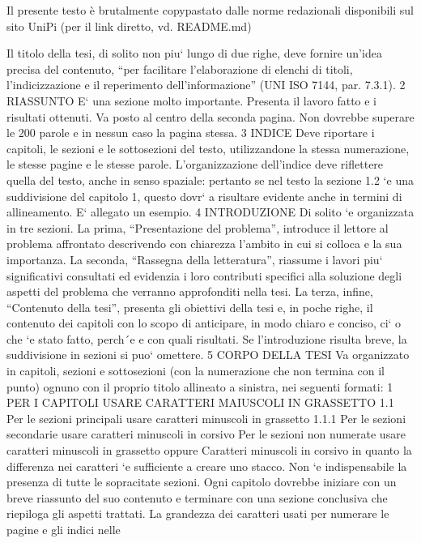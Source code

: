 Il presente testo è brutalmente copypastato dalle norme redazionali disponibili sul sito UniPi (per il link diretto, vd. README.md)

Il titolo della tesi, di solito non piu` lungo di due righe,
deve fornire un’idea precisa del contenuto, “per facilitare l’elaborazione di
elenchi di titoli, l’indicizzazione e il reperimento dell’informazione” (UNI
ISO 7144, par. 7.3.1).
2 RIASSUNTO
E` una sezione molto importante. Presenta il lavoro fatto e i risultati ottenuti.
Va posto al centro della seconda pagina. Non dovrebbe superare le 200 parole
e in nessun caso la pagina stessa.
3 INDICE
Deve riportare i capitoli, le sezioni e le sottosezioni del testo, utilizzandone
la stessa numerazione, le stesse pagine e le stesse parole. L’organizzazione
dell’indice deve riflettere quella del testo, anche in senso spaziale: pertanto
se nel testo la sezione 1.2 `e una suddivisione del capitolo 1, questo dovr` a
risultare evidente anche in termini di allineamento. E` allegato un esempio.
4 INTRODUZIONE
Di solito `e organizzata in tre sezioni. La prima, “Presentazione del problema”, introduce il lettore al problema affrontato descrivendo con chiarezza
l’ambito in cui si colloca e la sua importanza. La seconda, “Rassegna della
letteratura”, riassume i lavori piu` significativi consultati ed evidenzia i loro
contributi specifici alla soluzione degli aspetti del problema che verranno
approfonditi nella tesi. La terza, infine, “Contenuto della tesi”, presenta gli
obiettivi della tesi e, in poche righe, il contenuto dei capitoli con lo scopo
di anticipare, in modo chiaro e conciso, ci` o che `e stato fatto, perch´e e con quali risultati. Se l’introduzione risulta breve, la suddivisione in sezioni si
puo` omettere.
5 CORPO DELLA TESI
Va organizzato in capitoli, sezioni e sottosezioni (con la numerazione che
non termina con il punto) ognuno con il proprio titolo allineato a sinistra,
nei seguenti formati:
1 PER I CAPITOLI USARE CARATTERI MAIUSCOLI IN
GRASSETTO
1.1 Per le sezioni principali usare caratteri minuscoli in grassetto
1.1.1 Per le sezioni secondarie usare caratteri minuscoli in corsivo
Per le sezioni non numerate usare caratteri minuscoli in grassetto
oppure
Caratteri minuscoli in corsivo
in quanto la differenza nei caratteri `e sufficiente a creare uno stacco.
Non `e indispensabile la presenza di tutte le sopracitate sezioni.
Ogni capitolo dovrebbe iniziare con un breve riassunto del suo contenuto
e terminare con una sezione conclusiva che riepiloga gli aspetti trattati.
La grandezza dei caratteri usati per numerare le pagine e gli indici nelle
